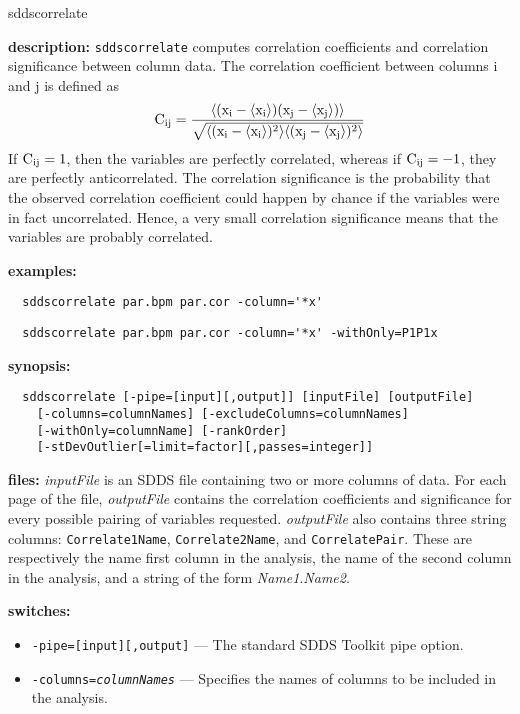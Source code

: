 \begin{sddsprog}{sddscorrelate}
\item {\bf description:}
  {\tt sddscorrelate} computes correlation coefficients and correlation
  significance between column data. The correlation coefficient between
  columns i and j is defined as
  \[ {\rm C_{ij} = \frac{\langle (x_i-\langle x_i \rangle) (x_j-\langle x_j \rangle)\rangle}
  {\sqrt{\langle (x_i-\langle x_i \rangle)^2\rangle \langle (x_j - \langle x_j \rangle)^2 \rangle}}} \]
  If ${\rm C_{ij}=1}$, then the variables are perfectly correlated, whereas if ${\rm C_{ij}=-1}$,
  they are perfectly anticorrelated. The correlation significance is the probability that the
  observed correlation coefficient could happen by chance if the variables were in fact
  uncorrelated. Hence, a very small correlation significance means that the variables are
  probably correlated.
\item {\bf examples:}
\begin{verbatim}
  sddscorrelate par.bpm par.cor -column='*x'
\end{verbatim}
\begin{verbatim}
  sddscorrelate par.bpm par.cor -column='*x' -withOnly=P1P1x
\end{verbatim}
\item {\bf synopsis:}
\begin{verbatim}
  sddscorrelate [-pipe=[input][,output]] [inputFile] [outputFile]
    [-columns=columnNames] [-excludeColumns=columnNames]
    [-withOnly=columnName] [-rankOrder]
    [-stDevOutlier[=limit=factor][,passes=integer]]
\end{verbatim}
\item {\bf files:}
  {\em inputFile} is an SDDS file containing two or more columns of data. For each page of
  the file, {\em outputFile} contains the correlation coefficients and significance for
  every possible pairing of variables requested. {\em outputFile} also contains three string
  columns: {\tt Correlate1Name}, {\tt Correlate2Name}, and {\tt CorrelatePair}. These are
  respectively the name first column in the analysis, the name of the second column in
  the analysis, and a string of the form {\em Name1}.{\em Name2}.
\item {\bf switches:}
  \begin{itemize}
  \item {\tt -pipe=[input][,output]} --- The standard SDDS Toolkit pipe option.
  \item {\tt -columns={\em columnNames}} --- Specifies the names of columns to be included in the analysis.

\end{itemize}
\end{sddsprog}
